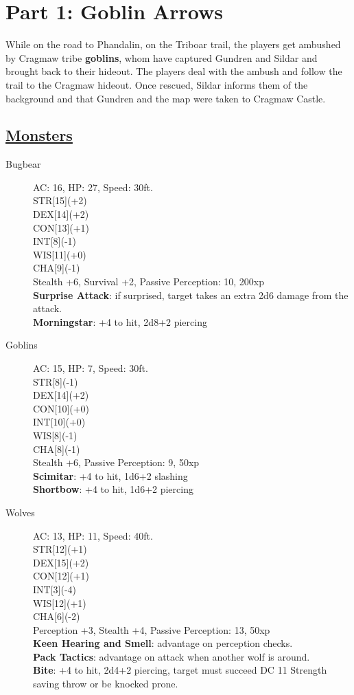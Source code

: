 	\section{Part 1: Goblin Arrows}

While on the road to Phandalin, on the Triboar trail, the players get ambushed by Cragmaw tribe \textbf{goblins}, whom have captured Gundren and Sildar and brought back to their hideout. The players deal with the ambush and follow the trail to the Cragmaw hideout. Once rescued, Sildar informs them of the background and that Gundren and the map were taken to Cragmaw Castle.

\subsection*{\underline{Monsters}}
\begin{description}
	\item[Bugbear] 
	AC: 16, HP: 27, Speed: 30ft.
	\\ STR[15](+2) 
	\\ DEX[14](+2)
	\\ CON[13](+1)
	\\ INT[8](-1)
	\\ WIS[11](+0)
	\\ CHA[9](-1) 
	\\ Stealth +6, Survival +2, Passive Perception: 10, 200xp
	\\ \textbf{Surprise Attack}: if surprised, target takes an extra 2d6 damage from the attack.
	\\ \textbf{Morningstar}: +4 to hit, 2d8+2 piercing
	\item[Goblins] 
	AC: 15, HP: 7, Speed: 30ft.
	\\ STR[8](-1) 
	\\ DEX[14](+2)
	\\ CON[10](+0)
	\\ INT[10](+0)
	\\ WIS[8](-1)
	\\ CHA[8](-1) 
	\\ Stealth +6, Passive Perception: 9, 50xp
	\\ \textbf{Scimitar}: +4 to hit, 1d6+2 slashing
	\\ \textbf{Shortbow}: +4 to hit, 1d6+2 piercing
	\item[Wolves]
	AC: 13, HP: 11, Speed: 40ft.
	\\ STR[12](+1) 
	\\ DEX[15](+2)
	\\ CON[12](+1)
	\\ INT[3](-4)
	\\ WIS[12](+1)
	\\ CHA[6](-2) 
	\\ Perception +3, Stealth +4, Passive Perception: 13, 50xp
	\\ \textbf{Keen Hearing and Smell}: advantage on perception checks.
	\\ \textbf{Pack Tactics}: advantage on attack when another wolf is around.
	\\ \textbf{Bite}: +4 to hit, 2d4+2 piercing, target must succeed DC 11 Strength saving throw or be knocked prone.
\end{description}


